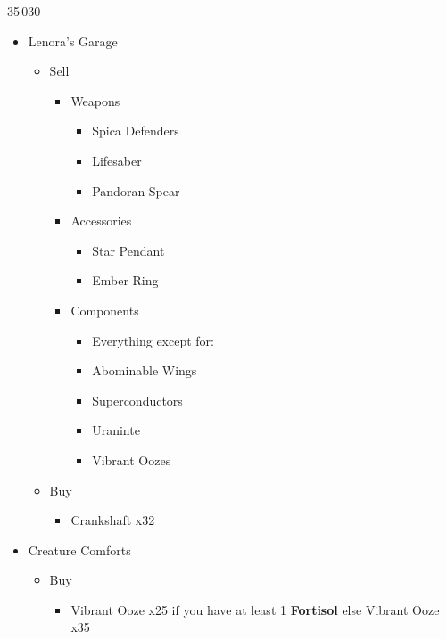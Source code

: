 \begin{shop}{35\,030}
\begin{multicols}{2}
\begin{itemize}
    \item Lenora's Garage
    \begin{itemize}
        \item Sell
        \begin{itemize}
            \item Weapons
            \begin{itemize}
                \item Spica Defenders
                \item Lifesaber
                \item Pandoran Spear
            \end{itemize}
            \item Accessories
            \begin{itemize}
                \item Star Pendant
                \item Ember Ring
            \end{itemize}
            \item Components
            \begin{itemize}
                \item Everything except for:
                \item Abominable Wings
                \item Superconductors
                \item Uraninte
                \item Vibrant Oozes
            \end{itemize}
        \end{itemize}
        \item Buy
        \begin{itemize}
            \item Crankshaft x32
        \end{itemize}
    \end{itemize}
    \columnbreak
    \item Creature Comforts
    \begin{itemize}
        \item Buy
        \begin{itemize}
            \item Vibrant Ooze x25 if you have at least 1 \textbf{Fortisol} else Vibrant Ooze x35
        \end{itemize}

\end{itemize}
\end{itemize}
\end{multicols}
\end{shop}
